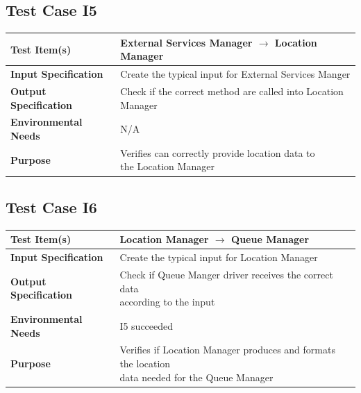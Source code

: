 \documentclass[11pt,titlepage]{article} %
\begin{document}
  \subsection{Test Case I5}
  \begin{table}[ht!]
    \begin{tabular*}{16cm}{ll}
	\hline
	\textbf{Test Item(s)} & External Services Manager  $ \longrightarrow $ Location Manager \\
	\hline
	\textbf{Input Specification} & Create the typical input for External Services Manger\\
	\hline
	\textbf{Output Specification} & Check if the correct method are called into Location Manager\\
	\hline
	\textbf{Environmental Needs} & N/A\\
	\hline
	\textbf{Purpose} & \pbox{20cm}{Verifies can correctly provide location data to \\ the Location Manager} \\
	\hline
    \end{tabular*}
  \end{table}
  
  \subsection{Test Case I6}
  \begin{table}[ht!]
    \begin{tabular*}{16cm}{ll}
	\hline
	\textbf{Test Item(s)} & Location Manager $ \longrightarrow $ Queue Manager \\
	\hline
	\textbf{Input Specification} & Create the typical input for Location Manager\\
	\hline
	\textbf{Output Specification} & \pbox{20cm}{Check if Queue Manger driver receives the correct data \\ according to the input} \\
	\hline
	\textbf{Environmental Needs} & I5 succeeded \\
	\hline
	\textbf{Purpose} & \pbox{20cm}{Verifies if Location Manager produces and formats the location \\ data needed for the Queue Manager} \\
	\hline
    \end{tabular*}
  \end{table}
  
\end{document}
